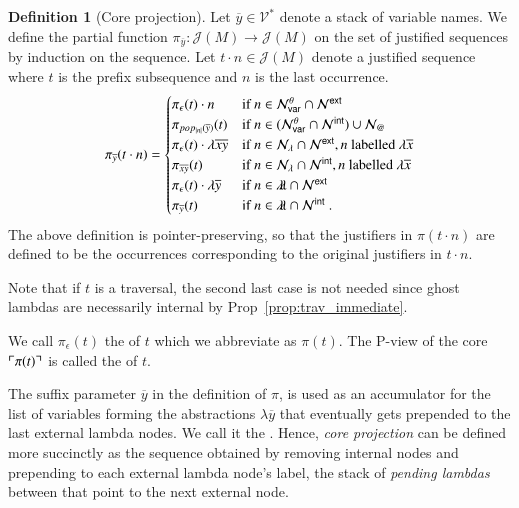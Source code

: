 \documentclass{elsarticle}
\makeatletter
\theoremstyle{plain}
\theoremstyle{definition}
\newtheorem{definition}{Definition}[section]
\theoremstyle{remark}
\newcommand\VarSet{\mathcal{V}}
\newcommand\Nodes{\mathcal{N}}%
\newcommand\NodesVar{\Nodes_{\sf var}}%
\newcommand\NodesLmd{\Nodes_\lambda}%
\newcommand\NodesApp{\Nodes_@}%
\newcommand{\ghostlmd}{{\lambda\!\!\lambda}}
\newcommand{\ghostvar}{\theta}
\newcommand\ImNodesVar{\NodesVar^\ghostvar}
\def\coresymbol{\pi} %
\newcommand{\core}[1]{\coresymbol(#1)} %
\newcommand{\ExtNodes}{\Nodes^{\sf ext}}
\newcommand{\IntNodes}{\Nodes^{\sf int}}
\def\justseqset{\mathcal{J}}
\makeatother
\begin{document}
\begin{definition}[Core projection]
\label{def:coreprojection}
Let $\overline{y} \in \VarSet^*$ denote a stack of variable names.
We define the partial function $\coresymbol_{\overline{y}}\colon \justseqset(M) \longrightarrow \justseqset(M)$ on the set of justified sequences by induction on the sequence.
Let $t \cdot n\in\justseqset(M)$ denote a justified sequence where $t$ is the prefix subsequence and $n$ is the last occurrence.
\begin{equation*}
\coresymbol_{\overline{y}}(t\cdot n) =
\begin{cases}
\coresymbol_{\epsilon}(t) \cdot n
    & \mbox{if } n\in\ImNodesVar\inter\ExtNodes \\
\coresymbol_{pop_{|n|}(\overline{y})}(t)
    & \mbox{if } n\in(\ImNodesVar\inter\IntNodes)\union\NodesApp \\
\coresymbol_{\epsilon}(t) \cdot \lambda \overline{x}\overline{y}
    & \mbox{if } n\in\NodesLmd\inter\ExtNodes, n \mbox{ labelled } \lambda\overline{x}\\
\coresymbol_{\overline{x} \overline{y}}(t)
    & \mbox{if } n\in\NodesLmd\inter\IntNodes, n \mbox{ labelled } \lambda\overline{x} \\
\coresymbol_{\epsilon}(t) \cdot\lambda\overline{y}
    & \mbox{if } n\in\ghostlmd\inter\ExtNodes \\
\coresymbol_{\overline{y}}(t)
    & \mbox{if } n\in\ghostlmd\inter\IntNodes \ .
\end{cases}
\end{equation*}
The above definition is pointer-preserving, so that the justifiers in $\coresymbol(t\cdot n)$ are defined to be the occurrences corresponding to the original justifiers in $t \cdot n$.

Note that if $t$ is a traversal, the second last case is not needed since ghost lambdas are necessarily internal by Prop~\ref{prop:trav_immediate}.

We call $\coresymbol_\epsilon(t)$ the  of $t$ which we abbreviate as $\core{t}$. The P-view of the core $\pview{\core{t}}$ is called the  of $t$.
\end{definition}

The suffix parameter $\overline{y}$ in the definition of $\coresymbol$, is used as an accumulator for the list of variables forming the abstractions $\lambda \overline{y}$ that eventually gets prepended to the last external lambda nodes. We call it the . Hence, \emph{core projection} can be defined more succinctly as the sequence obtained by removing internal nodes and prepending to each external lambda node's label, the stack of \emph{pending lambdas} between that point to the next external node.
\end{document}
